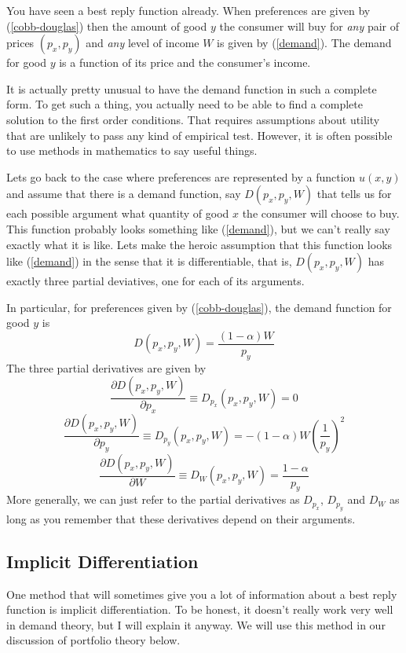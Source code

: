 \documentclass[12pt]{article}
\newcommand{\tmem}[1]{\textit{#1}}
\begin{document}
You have seen a best reply function already. When preferences are given by
(\ref{cobb-douglas}) then the amount of good $y$ the consumer will buy for
{\tmem{any}} pair of prices $( p_x, p_y )$ and {\tmem{any}} level of income
$W$ is given by (\ref{demand}). The demand for good $y$ is a function of its
price and the consumer's income.

It is actually pretty unusual to have the demand function in such a complete
form. To get such a thing, you actually need to be able to find a complete
solution to the first order conditions. That requires assumptions about
utility that are unlikely to pass any kind of empirical test. However, it is
often possible to use methods in mathematics to say useful things.

Lets go back to the case where preferences are represented by a function $u (
x, y )$ and assume that there is a demand function, say $D ( p_x, p_y, W )$
that tells us for each possible argument what quantity of good $x$ the
consumer will choose to buy. This function probably looks something like
(\ref{demand}), but we can't really say exactly what it is like. Lets make the
heroic assumption that this function looks like (\ref{demand}) in the sense
that it is differentiable, that is, $D ( p_x, p_y, W )$ has exactly three
partial deviatives, one for each of its arguments.

In particular, for preferences given by (\ref{cobb-douglas}), the demand
function for good $y$ is
\[ D ( p_x, p_y, W ) = \frac{( 1 - \alpha ) W}{p_y} \]
The three partial derivatives are given by
\[ \frac{\partial D ( p_x, p_y, W )}{\partial p_x} \equiv D_{p_x} ( p_x, p_y,
   W ) = 0 \]
\[ \frac{\partial D ( p_x, p_y, W )}{\partial p_y} \equiv D_{p_y} ( p_x, p_y,
   W ) = - ( 1 - \alpha ) W \left( \frac{1}{p_y} \right)^2 \]
\[ \frac{\partial D ( p_x, p_y, W )}{\partial W} \equiv D_W ( p_x, p_y, W ) =
   \frac{1 - \alpha}{p_y} \]
More generally, we can just refer to the partial derivatives as $D_{p_x}$,
$D_{p_y}$ and $D_W$ as long as you remember that these derivatives depend on
their arguments.

\subsection{Implicit Differentiation}

One method that will sometimes give you a lot of information about a best
reply function is implicit differentiation. To be honest, it doesn't really
work very well in demand theory, but I will explain it anyway. We will use
this method in our discussion of portfolio theory below.
\end{document}
